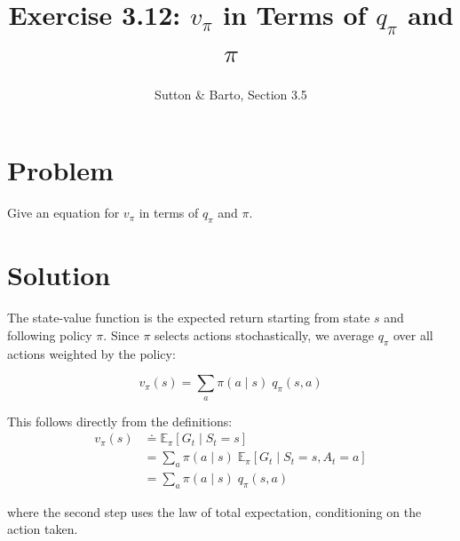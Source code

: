 \documentclass[11pt]{article}
\title{Exercise 3.12: $v_\pi$ in Terms of $q_\pi$ and $\pi$}
\author{Sutton \& Barto, Section 3.5}
\date{}
\begin{document}
\maketitle

\section*{Problem}

Give an equation for $v_\pi$ in terms of $q_\pi$ and $\pi$.

\section*{Solution}

The state-value function is the expected return starting from state $s$
and following policy $\pi$. Since $\pi$ selects actions stochastically,
we average $q_\pi$ over all actions weighted by the policy:

\[
    \boxed{v_\pi(s) = \sum_{a} \pi(a \mid s) \; q_\pi(s, a)}
\]

This follows directly from the definitions:
\begin{align*}
    v_\pi(s) &\doteq \mathbb{E}_\pi[G_t \mid S_t = s] \\
             &= \sum_{a} \pi(a \mid s) \; \mathbb{E}_\pi[G_t \mid S_t = s, A_t = a] \\
             &= \sum_{a} \pi(a \mid s) \; q_\pi(s, a)
\end{align*}

where the second step uses the law of total expectation, conditioning on
the action taken.
\end{document}
